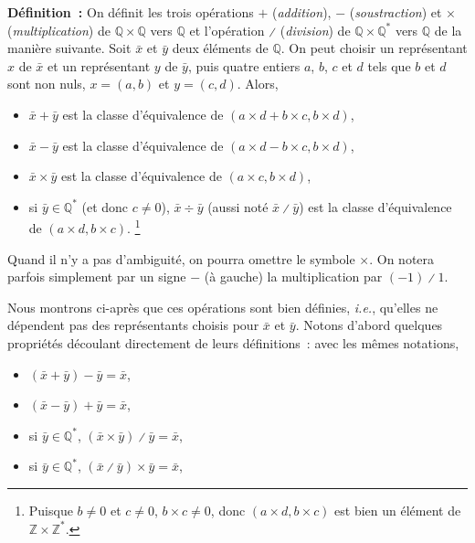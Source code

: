 \noindent\textbf{Définition :} On définit les trois opérations $+$ (\emph{addition}), $-$ (\emph{soustraction}) et $\times$ (\emph{multiplication}) de $\mathbb{Q} \times \mathbb{Q}$ vers $\mathbb{Q}$ et l'opération $\divslash$ (\emph{division}) de $\mathbb{Q} \times \mathbb{Q}^*$ vers $\mathbb{Q}$ de la manière suivante.  
\sindex[isy]{$+$}\sindex[isy]{$-$}\sindex[isy]{$\times$}\sindex[isy]{$\divslash$}
Soit $\bar{x}$ et $\bar{y}$ deux éléments de $\mathbb{Q}$. 
On peut choisir un représentant $x$ de $\bar{x}$ et un représentant $y$ de $\bar{y}$, puis quatre entiers $a$, $b$, $c$ et $d$ tels que $b$ et $d$ sont non nuls, $x = (a, b)$ et $y = (c, d)$.
Alors, 
\begin{itemize}[nosep]
    \item $\bar{x} + \bar{y}$ est la classe d'équivalence de $(a \times d + b \times c, b \times d)$,
    \item $\bar{x} - \bar{y}$ est la classe d'équivalence de $(a \times d - b \times c, b \times d)$,
    \item $\bar{x} \times \bar{y}$ est la classe d'équivalence de $(a \times c, b \times d)$,
    \item \sindex[isy]{$\div$} si $\bar{y} \in \mathbb{Q}^*$ (et donc $c \neq 0$), $\bar{x} \div \bar{y}$ (aussi noté $\bar{x} \divslash \bar{y}$) est la classe d'équivalence de $(a \times d, b \times c)$.%
        \footnote{Puisque $b \neq 0$ et $c \neq 0$, $b \times c \neq 0$, donc $(a \times d, b \times c)$ est bien un élément de $\mathbb{Z} \times \mathbb{Z}^*$.}
\end{itemize}
Quand il n'y a pas d'ambiguité, on pourra omettre le symbole $\times$. 
On notera parfois simplement par un signe $-$ (à gauche) la multiplication par $(-1) \divslash 1$.

\medskip

Nous montrons ci-après que ces opérations sont bien définies, \emph{i.e.}, qu'elles ne dépendent pas des représentants choisis pour $\bar{x}$ et $\bar{y}$.
Notons d'abord quelques propriétés découlant directement de leurs définitions : avec les mêmes notations, 
\begin{itemize}[nosep]
    \item $(\bar{x} + \bar{y}) - \bar{y} = \bar{x}$,
    \item $(\bar{x} - \bar{y}) + \bar{y} = \bar{x}$,
    \item si $\bar{y} \in \mathbb{Q}^*$, $(\bar{x} \times \bar{y}) \divslash \bar{y} = \bar{x}$,
    \item si $\bar{y} \in \mathbb{Q}^*$, $(\bar{x} \divslash \bar{y}) \times \bar{y} = \bar{x}$,
\end{itemize}

